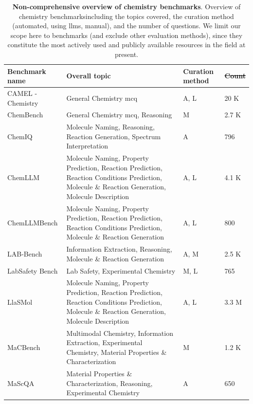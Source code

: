 \documentclass[11pt, oneside]{article}
\makeatletter
\providecommand{\DIFaddtex}[1]{{\protect\color{blue}\uwave{#1}}} %
\providecommand{\DIFdeltex}[1]{{\protect\color{red}\sout{#1}}} %
\providecommand{\DIFaddFL}[1]{\DIFadd{#1}} %
\providecommand{\DIFdelFL}[1]{\DIFdel{#1}} %
\providecommand{\DIFaddbeginFL}{} %
\providecommand{\DIFaddendFL}{} %
\providecommand{\DIFdelbeginFL}{} %
\providecommand{\DIFdelendFL}{} %
\providecommand{\DIFadd}[1]{\texorpdfstring{\DIFaddtex{#1}}{#1}} %
\providecommand{\DIFdel}[1]{\texorpdfstring{\DIFdeltex{#1}}{}} %
\newcommand{\DIFscaledelfig}{0.5}
\newlength{\DIFdelgraphicswidth} %
\newlength{\DIFdelgraphicsheight} %
\newcommand{\DIFaddincludegraphics}[2][]{{\color{blue}\fbox{\DIFOincludegraphics[#1]{#2}}}} %
\newcommand{\DIFdelincludegraphics}[2][]{%
\sbox{\DIFdelgraphicsbox}{\DIFOincludegraphics[#1]{#2}}%
\settoboxwidth{\DIFdelgraphicswidth}{\DIFdelgraphicsbox} %
\settoboxtotalheight{\DIFdelgraphicsheight}{\DIFdelgraphicsbox} %
\scalebox{\DIFscaledelfig}{%
\parbox[b]{\DIFdelgraphicswidth}{\usebox{\DIFdelgraphicsbox}\\[-\baselineskip] \rule{\DIFdelgraphicswidth}{0em}}\llap{\resizebox{\DIFdelgraphicswidth}{\DIFdelgraphicsheight}{%
\setlength{\unitlength}{\DIFdelgraphicswidth}%
\begin{picture}(1,1)%
\thicklines\linethickness{2pt} %
{\color[rgb]{1,0,0}\put(0,0){\framebox(1,1){}}}%
{\color[rgb]{1,0,0}\put(0,0){\line( 1,1){1}}}%
{\color[rgb]{1,0,0}\put(0,1){\line(1,-1){1}}}%
\end{picture}%
}\hspace*{3pt}}} %
} %
\DeclareRobustCommand{\DIFaddbeginFL}{\DIFOaddbeginFL \let\includegraphics\DIFaddincludegraphics} %
\DeclareRobustCommand{\DIFaddendFL}{\DIFOaddendFL \let\includegraphics\DIFOincludegraphics} %
\DeclareRobustCommand{\DIFdelbeginFL}{\DIFOdelbeginFL \let\includegraphics\DIFdelincludegraphics} %
\DeclareRobustCommand{\DIFdelendFL}{\DIFOaddendFL \let\includegraphics\DIFOincludegraphics} %
\let\sout@orig\sout %
\renewcommand{\sout}[1]{\ifmmode\text{\sout@orig{\ensuremath{#1}}}\else\sout@orig{#1}\fi} %
\makeatother
\begin{document}
\begin{table}
\centering
\footnotesize
\caption{\textbf{Non-comprehensive overview of chemistry benchmarks}. Overview of chemistry benchmarks\DIFaddbeginFL \DIFaddFL{, }\DIFaddendFL including the topics covered, the curation method (automated, using \glspl{llm}, manual), and the \DIFaddbeginFL \DIFaddFL{approximate }\DIFaddendFL number of questions. We limit our scope here to benchmarks (and exclude other evaluation methods), since they constitute the most actively used and publicly available resources in the field at present.}
\label{tab:chemistry_benchmarks}
\begin{tabular}{p{3cm} p{6.9cm} p{1.2cm} p{1cm}}
\toprule
\textbf{Benchmark name} & \textbf{Overall topic} & \textbf{Curation method} & \textbf{\DIFdelbeginFL \DIFdelFL{Count}\DIFdelendFL \DIFaddbeginFL \DIFaddFL{Approx. count}\DIFaddendFL } \\
\midrule
CAMEL - Chemistry \autocite{li2023camel} & General Chemistry \gls{mcq} & A, L & 20 K \\
ChemBench \autocite{mirza2024large} & General Chemistry \gls{mcq}, Reasoning & M & 2.7 K \\
ChemIQ \autocite{runcie2025assessing} & Molecule Naming, Reasoning, Reaction Generation, Spectrum Interpretation & A & 796 \\
ChemLLM \autocite{zhang2024chemllm} & Molecule Naming, Property Prediction, Reaction Prediction, Reaction Conditions Prediction, Molecule \& Reaction Generation, Molecule Description & A, L & 4.1 K \\
ChemLLMBench \autocite{guo2023large} & Molecule Naming, Property Prediction, Reaction Prediction, Reaction Conditions Prediction, Molecule \& Reaction Generation & A, L & 800 \\
LAB-Bench \autocite{laurent2024lab0bench0} & Information Extraction, Reasoning, Molecule \& Reaction Generation & A, M & 2.5 K \\
LabSafety Bench \autocite{zhou2024labsafety} & Lab Safety, Experimental Chemistry & M, L & 765 \\
LlaSMol \autocite{yu2024llasmol} & Molecule Naming, Property Prediction, Reaction Prediction, Reaction Conditions Prediction, Molecule \& Reaction Generation, Molecule Description & A, L & 3.3 M \\
MaCBench \autocite{alampara2024probing} & Multimodal Chemistry, Information Extraction, Experimental Chemistry, Material Properties \& Characterization & M & 1.2 K \\
MaScQA \autocite{zaki2023mascqa0} & Material Properties \& Characterization, Reasoning, Experimental Chemistry & A & 650 \\

\end{tabular}
\end{table}
\end{document}
